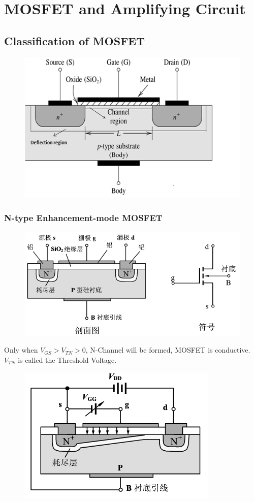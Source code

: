 \chapter{MOSFET and Amplifying Circuit}

\section{Classification of MOSFET}

\begin{figure}[H]
  \centering
  \includegraphics[width=0.7\linewidth]{figures/MOSFET-BLOCK-DIAGRAM.png}
\end{figure}

\subsection{N-type Enhancement-mode MOSFET}

\begin{figure}[H]
  \centering
  \includegraphics[width=0.7\linewidth]{figures/ENMOS}
\end{figure}

Only when $V_{GS} > V_{TN} > 0$, N-Channel will be formed, MOSFET is conductive. $V_{TN}$ is called the Threshold Voltage.

\begin{figure}[H]
  \centering
  \includegraphics[width=0.5\linewidth]{figures/ENMOS2}
\end{figure}


